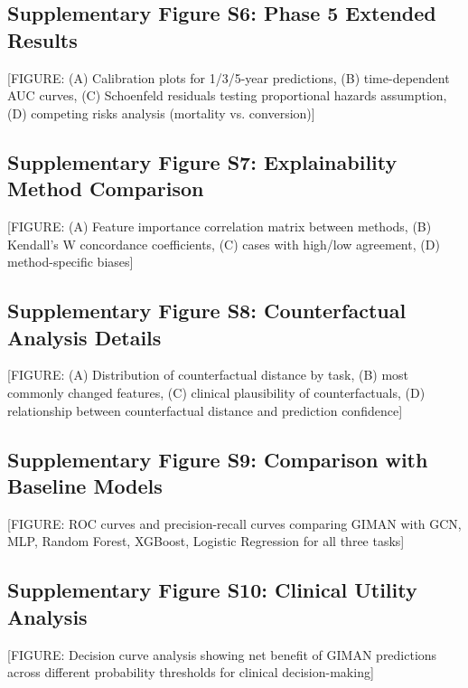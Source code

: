 \documentclass[11pt]{article}
\begin{document}
\subsection{Supplementary Figure S6: Phase 5 Extended Results}

[FIGURE: (A) Calibration plots for 1/3/5-year predictions, (B) time-dependent AUC curves, (C) Schoenfeld residuals testing proportional hazards assumption, (D) competing risks analysis (mortality vs. conversion)]

\subsection{Supplementary Figure S7: Explainability Method Comparison}

[FIGURE: (A) Feature importance correlation matrix between methods, (B) Kendall's W concordance coefficients, (C) cases with high/low agreement, (D) method-specific biases]

\subsection{Supplementary Figure S8: Counterfactual Analysis Details}

[FIGURE: (A) Distribution of counterfactual distance by task, (B) most commonly changed features, (C) clinical plausibility of counterfactuals, (D) relationship between counterfactual distance and prediction confidence]

\subsection{Supplementary Figure S9: Comparison with Baseline Models}

[FIGURE: ROC curves and precision-recall curves comparing GIMAN with GCN, MLP, Random Forest, XGBoost, Logistic Regression for all three tasks]

\subsection{Supplementary Figure S10: Clinical Utility Analysis}

[FIGURE: Decision curve analysis showing net benefit of GIMAN predictions across different probability thresholds for clinical decision-making]
\end{document}
